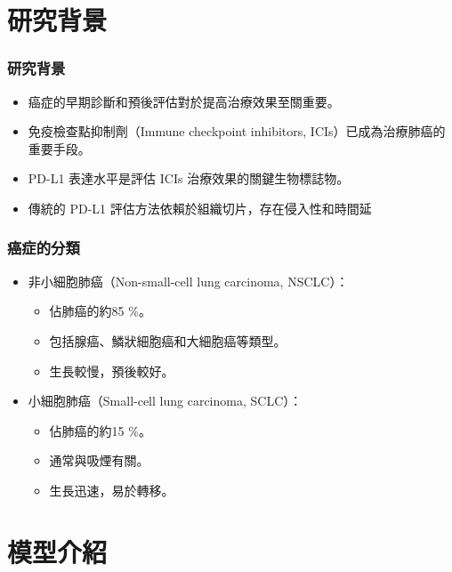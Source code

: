 \documentclass[xcolor=dvipsnames]{beamer}
\begin{document}
    \section{研究背景}
    \begin{frame}
        \sectionpage
    \end{frame}
    \begin{frame}
        \frametitle{研究背景}
        \begin{itemize}
            \item 癌症的早期診斷和預後評估對於提高治療效果至關重要。
            \item 免疫檢查點抑制劑（Immune checkpoint inhibitors, ICIs）已成為治療肺癌的重要手段。
            \item PD-L1 表達水平是評估 ICIs 治療效果的關鍵生物標誌物。
            \item 傳統的 PD-L1 評估方法依賴於組織切片，存在侵入性和時間延       
        \end{itemize}
    \end{frame}


    \begin{frame}
        \frametitle{癌症的分類}
        \begin{itemize}
            \item 非小細胞肺癌（Non-small-cell lung carcinoma, NSCLC）：
                \begin{itemize}
                    \item 佔肺癌的約85 \%。
                    \item 包括腺癌、鱗狀細胞癌和大細胞癌等類型。
                    \item 生長較慢，預後較好。
                \end{itemize}

            \item 小細胞肺癌（Small-cell lung carcinoma, SCLC）：
                \begin{itemize}
                    \item 佔肺癌的約15 \%。
                    \item 通常與吸煙有關。
                    \item 生長迅速，易於轉移。
                \end{itemize}

        \end{itemize}
    \end{frame}

    \section{模型介紹}
    \begin{frame}
        \sectionpage
    \end{frame}
\end{document}
